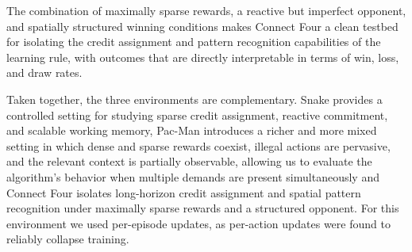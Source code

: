 The combination of maximally sparse rewards, a reactive but imperfect opponent, and
spatially structured winning conditions makes Connect Four a clean testbed for isolating
the credit assignment and pattern recognition capabilities of the learning rule, with
outcomes that are directly interpretable in terms of win, loss, and draw rates.

Taken together, the three environments are complementary. Snake provides a controlled setting for studying sparse credit assignment,
reactive commitment, and scalable working memory, Pac-Man introduces a richer and more mixed setting in which dense
and sparse rewards coexist, illegal actions are pervasive, and the relevant context is
partially observable, allowing us to evaluate the algorithm's behavior when multiple
demands are present simultaneously and Connect Four isolates long-horizon
credit assignment and spatial pattern recognition under maximally sparse rewards and a
structured opponent. For this environment we used per-episode updates, as per-action updates were found to reliably collapse training.